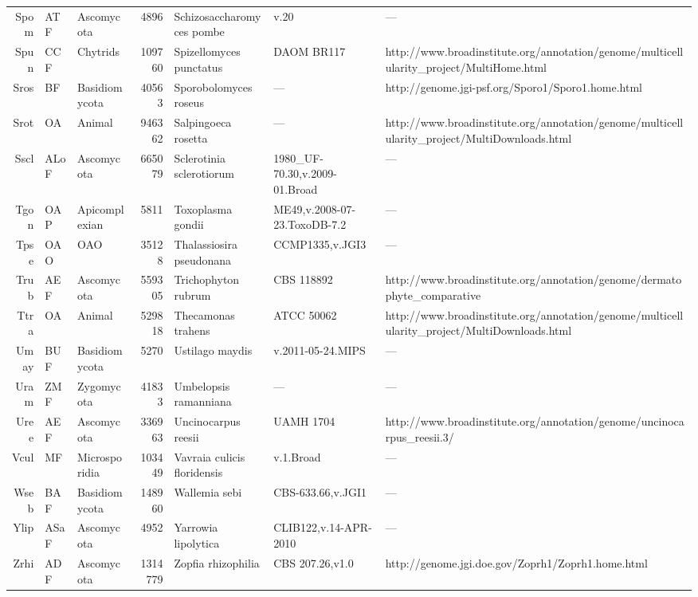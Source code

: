 {{\begin{longtable}{rllrlll}
  Spom & ATF & Ascomycota & 4896 & Schizosaccharomyces pombe & v.20 & --- \\ 
  Spun & CCF & Chytrids & 109760 & Spizellomyces punctatus & DAOM BR117 & http://www.broadinstitute.org/annotation/genome/multicellularity\_project/MultiHome.html \\ 
  Sros & BF & Basidiomycota & 40563 & Sporobolomyces roseus & --- & http://genome.jgi-psf.org/Sporo1/Sporo1.home.html \\ 
  Srot & OA & Animal & 946362 & Salpingoeca rosetta & --- & http://www.broadinstitute.org/annotation/genome/multicellularity\_project/MultiDownloads.html \\ 
  Sscl & ALoF & Ascomycota & 665079 & Sclerotinia sclerotiorum & 1980\_UF-70.30,v.2009-01.Broad & --- \\ 
  Tgon & OAP & Apicomplexian & 5811 & Toxoplasma gondii & ME49,v.2008-07-23.ToxoDB-7.2 & --- \\ 
  Tpse & OAO & OAO & 35128 & Thalassiosira pseudonana & CCMP1335,v.JGI3 & --- \\ 
  Trub & AEF & Ascomycota & 559305 & Trichophyton rubrum & CBS 118892 & http://www.broadinstitute.org/annotation/genome/dermatophyte\_comparative \\ 
  Ttra & OA & Animal & 529818 & Thecamonas trahens & ATCC 50062 & http://www.broadinstitute.org/annotation/genome/multicellularity\_project/MultiDownloads.html \\ 
  Umay & BUF & Basidiomycota & 5270 & Ustilago maydis & v.2011-05-24.MIPS & --- \\ 
  Uram & ZMF & Zygomycota & 41833 & Umbelopsis ramanniana & --- & --- \\ 
  Uree & AEF & Ascomycota & 336963 & Uncinocarpus reesii & UAMH 1704 & http://www.broadinstitute.org/annotation/genome/uncinocarpus\_reesii.3/ \\ 
  Vcul & MF & Microsporidia & 103449 & Vavraia culicis floridensis & v.1.Broad & --- \\ 
  Wseb & BAF & Basidiomycota & 148960 & Wallemia sebi & CBS-633.66,v.JGI1 & --- \\ 
  Ylip & ASaF & Ascomycota & 4952 & Yarrowia lipolytica & CLIB122,v.14-APR-2010 & --- \\ 
  Zrhi & ADF & Ascomycota & 1314779 & Zopfia rhizophilia & CBS 207.26,v1.0 & http://genome.jgi.doe.gov/Zoprh1/Zoprh1.home.html \\ 
   \hline
\hline
\end{longtable}
} %
} %
